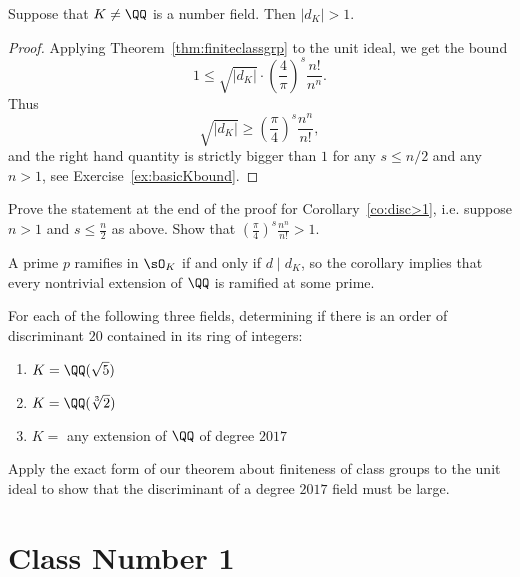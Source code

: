 \begin{corollary}\label{co:disc>1}
	Suppose that $K\neq \QQ$ is a number field.  Then $|d_K|>1$.
\end{corollary}
\begin{proof}
	Applying Theorem~\ref{thm:finiteclassgrp} to the unit ideal,
	we get the bound
	$$
	1\leq \sqrt{|d_K|}\cdot \left(\frac{4}{\pi}\right)^s\frac{n!}{n^n}.
	$$
	Thus
	$$
	\sqrt{|d_K|}
	\geq
	\left(\frac{\pi}{4}\right)^s\frac{n^n}{n!},
	$$
	and the right hand quantity is strictly bigger than $1$ for
	any $s\leq n/2$ and any $n>1$, see Exercise~\ref{ex:basicKbound}.
\end{proof}

\begin{exercise}\label{ex:basicKbound}
	Prove the statement at the end of the proof for Corollary~\ref{co:disc>1},
	i.e. suppose $n>1$ and $s\leq \frac{n}{2}$ as above. Show that
	$\left(\frac{\pi}{4}\right)^s\frac{n^n}{n!} > 1.$
\end{exercise}

A prime $p$ ramifies in $\sO_K$ if and only if $d\mid d_K$,
so the corollary implies that every nontrivial extension of $\QQ$
is ramified at some prime.

\begin{exercise}
	For each of the following three fields, determining if there is
	an order of discriminant $20$ contained in its ring of integers:
	\begin{enumerate}[label=(\alph*)]
		\item $K = \QQ(\sqrt{5})$
		\item $K = \QQ(\sqrt[3]{2})$
		\item $K = $ any extension of $\QQ$ of degree $2017$
	\end{enumerate}

	\begin{hint}
		Apply the exact form of our theorem about finiteness of class groups
		to the unit ideal to show that the discriminant of a degree $2017$
		field must be large.
	\end{hint}
\end{exercise}

\section{Class Number 1}\label{sec:cn1}

